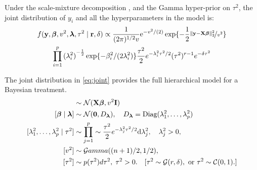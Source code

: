 \documentclass[ba]{imsart}
\begin{document}
\eeq
Under the scale-mixture decomposition \label{eq:v_i}, and the Gamma hyper-prior on $\tau^2$, the joint distribution of $y_i$ and all the hyperparameters in the model is:
\begin{multline}
f({\bf y}, \boldsymbol{\beta}, v^2, \boldsymbol{\lambda}, \tau^2 \mid {\bf r}, \delta) \propto 
\frac{1}{(2 \pi)^{1/2} v} {\rm e}^{-{v^2}/({2})} \exp\{- \frac{1}{2} \nicefrac{\lVert{\bf y} - {\bf X} \boldsymbol{\beta}\rVert_2^2 }{v^2}\} \\
\prod_{i=1}^{p} {(\lambda_i^2)}^{-\frac{1}{2}} \exp\{-\beta_i^2/(2\lambda_i^2)\} \frac{\tau^2}{2} e^{-\lambda_i^2\tau^2/2} (\tau^2)^{r-1} e^{-\delta \tau^2} \label{eq:joint}
\end{multline}

The joint distribution in \eqref{eq:joint} provides the full hierarchical model for a Bayesian treatment. 
\begin{align*}
[\y \mid \bbeta, v^2] & \sim \NormRV(\X \bbeta, v^2 \I) \\
[\bbeta \mid \blambda] & \sim \NormRV(\0, D_{\blambda}), \quad D_{\blambda} = \text{Diag}(\lambda_1^2, \ldots, \lambda_p^2) \\
[\lambda_1^2, \ldots, \lambda_p^2 \mid \tau^2] & \sim \prod_{j=1}^{p} \sim \frac{\tau^2}{2} e^{-\lambda_j^2\tau^2/2} \d \lambda_j^2, \quad \lambda_j^2 > 0, \\
[v^2] & \sim \mathcal{G}amma((n+1)/2 , 1/2),  \\
[\tau^2] & \sim p(\tau^2) d\tau^2,  \; \tau^2 > 0. \quad [ \tau^2 \sim \GammaRV(r, \delta), \text{ or } \tau^2 \sim \CauchyRV(0,1). ]
\end{align*}


\end{document}
